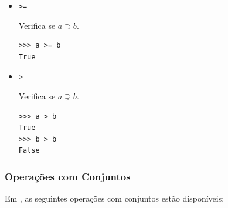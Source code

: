 \begin{itemize}
\item \lstinline+>=+ 

    Verifica se $a\supset b$.

\begin{lstlisting}[xrightmargin=2.5em]
>>> a >= b
True
\end{lstlisting}

\item \lstinline+>+ 

  Verifica se $a\supsetneq b$.
  
\begin{lstlisting}[xrightmargin=2.5em]
>>> a > b
True
>>> b > b
False
\end{lstlisting}
\end{itemize}


\subsubsection{Operações com Conjuntos}

Em {\python}, as seguintes operações com conjuntos estão disponíveis:

